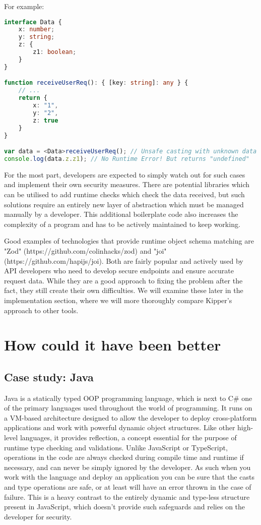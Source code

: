 For example:

\begin{lstlisting}[language=TypeScript]
interface Data {
	x: number;
	y: string;
	z: {
		z1: boolean;
	}
}

function receiveUserReq(): { [key: string]: any } {
	// ...
	return {
		x: "1",
		y: "2",
		z: true
	}
}

var data = <Data>receiveUserReq(); // Unsafe casting with unknown data
console.log(data.z.z1); // No Runtime Error! But returns "undefined"
\end{lstlisting}

For the most part, developers are expected to simply watch out for such cases and implement their own security measures. There are potential libraries which can be utilised to add runtime checks which check the data received, but such solutions require an entirely new layer of abstraction which must be managed manually by a developer. This additional boilerplate code also increases the complexity of a program and has to be actively maintained to keep working. 

Good examples of technologies that provide runtime object schema matching are "Zod" (https://github.com/colinhacks/zod) and "joi" (https://github.com/hapijs/joi). Both are fairly popular and actively used by API developers who need to develop secure endpoints and ensure accurate request data. While they are a good approach to fixing the problem after the fact, they still create their own difficulties. We will examine these later in the implementation section, where we will more thoroughly compare Kipper's approach to other tools.

\section{How could it have been better}

\subsection{Case study: Java}

Java is a statically typed OOP programming language, which is next to C\# one of the primary languages used throughout the world of programming. It runs on a VM-based architecture designed to allow the developer to deploy cross-platform applications and work with powerful dynamic object structures. Like other high-level languages, it provides reflection, a concept essential for the purpose of runtime type checking and validations. Unlike JavaScript or TypeScript, operations in the code are always checked during compile time and runtime if necessary, and can never be simply ignored by the developer. As such when you work with the language and deploy an application you can be sure that the casts and type operations are safe, or at least will have an error thrown in the case of failure. This is a heavy contrast to the entirely dynamic and type-less structure present in JavaScript, which doesn't provide such safeguards and relies on the developer for security. 

